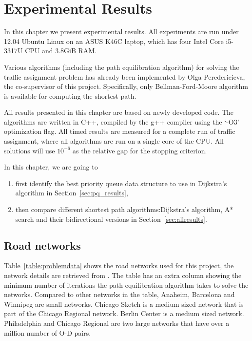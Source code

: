 \chapter{Experimental Results}\label{chap:results}
In this chapter we present experimental results.
All experiments are run under 12.04 Ubuntu Linux on an ASUS K46C laptop,
which has four Intel Core i5-3317U CPU and 3.8GiB RAM.

Various algorithms (including the path equilibration algorithm) for solving
the traffic assignment problem has already been implemented by Olga Perederieieva, the co-supervisor of this project.
Specifically, only Bellman-Ford-Moore algorithm is available for computing the shortest path. 

All results presented in this chapter are based on newly developed code.
The algorithms are written in C++, compiled by the g++ compiler using the `-O3' optimization flag.
All timed results are measured for a complete run of traffic assignment,
where all algorithms are run on a single core of the CPU.
All solutions will use $10^{-6}$ as the relative gap for the stopping criterion.

In this chapter, we are going to
\begin{enumerate}
    \item first identify the best priority queue data structure to use in Dijkstra's algorithm in Section~\ref{sec:pq_results},
    \item then compare different shortest path algorithms:Dijkstra's algorithm, A* search and their bidirectional versions in Section~\ref{sec:allresults}.
\end{enumerate}

\section{Road networks}

Table~\ref{table:problemdata} shows the road networks used for this project, the network details are retrieved from \citet{ProblemData}.
The table has an extra column showing the minimum number of iterations the path equilibration algorithm takes to solve the networks.
Compared to other networks in the table,
Anaheim, Barcelona and Winnipeg are small networks.
Chicago Sketch is a medium sized network that is part of the Chicago Regional network.
Berlin Center is a medium sized network.
Philadelphia and Chicago Regional are two large networks that have over a million number of O-D pairs.

